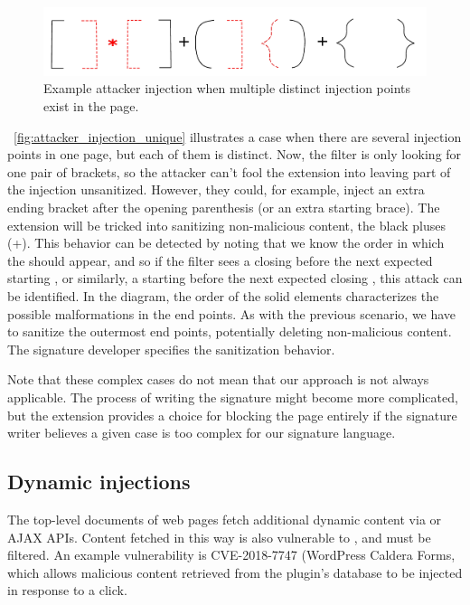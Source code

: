 \begin{figure}[h]
	\begin{center}
	\includegraphics[scale=0.25]{img/attacker_injection_unique.pdf}
	\caption{Example attacker injection when multiple distinct injection points exist in the page.}
	\label{fig:attacker_injection_unique}
	\end{center}
\end{figure}


~\autoref{fig:attacker_injection_unique} illustrates a case when
there are several injection points in one page, but each of them is
distinct. Now, the filter is only looking for one pair of brackets, so
the attacker can't fool the extension into leaving part of the
injection unsanitized. However, they could, for example, inject an
extra ending bracket after the opening parenthesis (or an extra
starting brace). The extension will be tricked into sanitizing
non-malicious content, the black pluses (+). This behavior can be
detected by noting that we know the order in which the
 should appear, and so if the filter sees a closing
 before the next expected starting , or
similarly, a starting  before the next expected closing
, this attack can be identified. In the diagram, the
order of the solid elements characterizes the possible malformations
in the end points. As with the previous scenario, we have to sanitize
the outermost end points, potentially deleting non-malicious
content. The signature developer specifies the sanitization behavior.

Note that these complex cases do not mean that our approach is not always applicable. The process of writing the signature might become more complicated, but the extension provides a choice for blocking the page entirely if the signature writer believes a given case is too complex for our signature language.

\subsection{Dynamic injections} \label{dynamic_injections}

The top-level documents of web pages fetch additional dynamic content
via  or AJAX APIs. Content fetched in
this way is also vulnerable to \xss, and must be filtered. An example
vulnerability is CVE-2018-7747 (WordPress Caldera Forms, which allows malicious
content retrieved from the plugin's database to be injected in response to a click.

